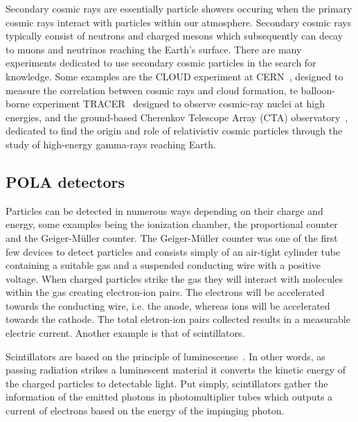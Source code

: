\documentclass[12pt,a4paper]{amsart}
\begin{document}
Secondary cosmic rays are essentially particle showers occuring when the primary cosmic rays interact with particles within our atmosphere. Secondary cosmic rays typically consist of neutrons and charged mesons which subsequently can decay to muons and neutrinos reaching the Earth's surface. There are many experiments dedicated to use secondary cosmic particles in the search for knowledge. Some examples are the CLOUD experiment at CERN~\cite{cloud2000}, designed to measure the correlation between cosmic rays and cloud formation, te balloon-borne experiment TRACER~\cite{tracer2007} designed to observe cosmic-ray nuclei at high energies, and the ground-based Cherenkov Telescope Array (CTA) observatory~\cite{cta2011}, dedicated to find the origin and role of relativistiv cosmic particles through the study of high-energy gamma-rays reaching Earth.

\setcounter{section}{2}
\setcounter{subsection}{0}
\subsection{POLA detectors}
Particles can be detected in numerous ways depending on their charge and energy, some examples being the ionization chamber, the proportional counter and the Geiger-Müller counter. The Geiger-Müller counter was one of the first few devices to detect particles and consists simply of an air-tight cylinder tube containing a suitable gas and a suspended conducting wire with a positive voltage. When charged particles strike the gas they will interact with molecules within the gas creating electron-ion pairs. The electrons will be accelerated towards the conducting wire, i.e. the anode, whereas ions will be accelerated towards the cathode. The total eletron-ion pairs collected results in a measurable electric current. Another example is that of scintillators.

Scintillators are based on the principle of luminescense~\cite{knoll2000}. In other words, as passing radiation strikes a luminescent material it converts the kinetic energy of the charged particles to detectable light. Put simply, scintillators gather the information of the emitted photons in photomultiplier tubes which outputs a current of electrons based on the energy of the impinging photon.

\end{document}
